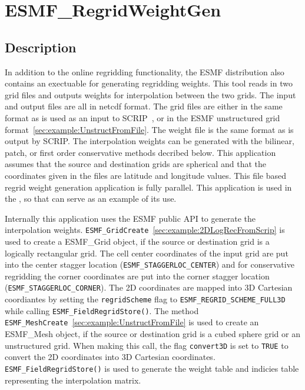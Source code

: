 
\section{ESMF\_RegridWeightGen}
\label{sec:ESMF_RegridWeightGen}

\subsection{Description}

 In addition to the online regridding functionality, the ESMF distribution also 
contains an exectuable for generating regridding weights. This tool reads in
two grid files and outputs weights for interpolation
between the two grids. The input and output files are all in netcdf format. The grid files are either in 
the same format as is used as an input to SCRIP~\cite{ref:SCRIP}, or in the ESMF unstructured grid format~\ref{sec:example:UnstructFromFile}. The weight file is the same format as is output by SCRIP. The interpolation weights can be generated with
the bilinear, patch, or first order conservative methods decribed below. This application assumes that the
source and destination grids are spherical and that the coordinates given in the files are latitude and longitude
values. This file based regrid weight generation application is fully parallel. This application is used in the 
, so that can serve as an example of its use.

Internally this application uses the ESMF public API to generate the interpolation weights.
{\tt ESMF\_GridCreate}~\ref{sec:example:2DLogRecFromScrip} is used to create a 
ESMF\_Grid object, if the source or destination grid is a logically rectangular grid. The cell center 
coordinates of the input grid are put into the center stagger location ({\tt ESMF\_STAGGERLOC\_CENTER})
and for conservative regridding the corner coordinates are put into the corner stagger location 
({\tt ESMF\_STAGGERLOC\_CORNER}). The 2D coordinates are mapped
into 3D Cartesian coordiantes by setting the {\tt regridScheme} flag to {\tt ESMF\_REGRID\_SCHEME\_FULL3D} while calling 
{\tt ESMF\_FieldRegridStore()}.   The method
{\tt ESMF\_MeshCreate}~\ref{sec:example:UnstructFromFile} is used to create an ESMF\_Mesh object, if the 
source or destination grid is a cubed sphere grid or an unstructured grid. When making this call, 
the flag {\tt convert3D} is set to {\tt TRUE} to convert the 2D coordinates into 3D Cartesian coordinates.
{\tt ESMF\_FieldRegridStore()} is used to generate the weight table and indicies table representing the interpolation matrix. 

